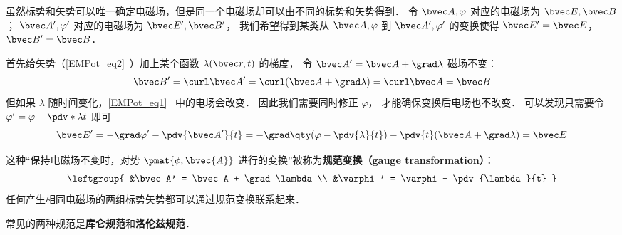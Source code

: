 
\begin{issues}
\issueDraft
\end{issues}


虽然标势和矢势可以唯一确定电磁场，但是同一个电磁场却可以由不同的标势和矢势得到． 令 $\bvec A, \varphi$ 对应的电磁场为 $\bvec E, \bvec B$； $\bvec A', \varphi'$ 对应的电磁场为 $\bvec E', \bvec B'$， 我们希望得到某类从 $\bvec A, \varphi$ 到 $\bvec A', \varphi'$ 的变换使得 $\bvec E' = \bvec E$， $\bvec B' = \bvec B$．

首先给矢势（\autoref{EMPot_eq2}~）加上某个函数 $\lambda(\bvec r, t)$ 的梯度， 令 $\bvec A' = \bvec A + \grad\lambda$ 磁场不变：
\begin{equation}
\bvec B' = \curl \bvec A' = \curl (\bvec A + \grad \lambda) = \curl \bvec A = \bvec B
\end{equation}
但如果 $\lambda$ 随时间变化，\autoref{EMPot_eq1}~ 中的电场会改变． 因此我们需要同时修正 $\varphi$， 才能确保变换后电场也不改变． 可以发现只需要令 $\varphi' = \varphi - \pdv*{\lambda}{t}$ 即可
\begin{equation}
\bvec E' = -\grad \varphi' - \pdv{\bvec A'}{t} = -\grad \qty(\varphi - \pdv{\lambda}{t}) - \pdv{t} (\bvec A + \grad \lambda) = \bvec E
\end{equation}


这种“保持电磁场不变时，对势 $\pmat{\phi, \bvec{A}}$ 进行的变换”被称为\textbf{规范变换（gauge transformation）}：
\begin{equation}\label{Gauge_eq3}
\leftgroup{
&\bvec A' = \bvec A + \grad \lambda\\
&\varphi' = \varphi - \pdv{\lambda}{t}
}\end{equation}
任何产生相同电磁场的两组标势矢势都可以通过规范变换联系起来．

常见的两种规范是\textbf{库仑规范}和\textbf{洛伦兹规范}．
